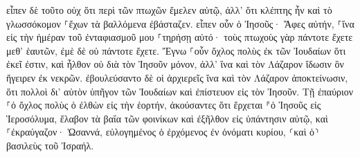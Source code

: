 \documentclass{openreader}
\begin{document}
εἶπεν δὲ τοῦτο οὐχ ὅτι περὶ τῶν πτωχῶν ἔμελεν αὐτῷ, ἀλλ’ ὅτι κλέπτης ἦν καὶ τὸ γλωσσόκομον ⸀ἔχων τὰ βαλλόμενα ἐβάσταζεν. 
εἶπεν οὖν ὁ Ἰησοῦς· Ἄφες αὐτήν, ⸀ἵνα εἰς τὴν ἡμέραν τοῦ ἐνταφιασμοῦ μου ⸀τηρήσῃ αὐτό· 
τοὺς πτωχοὺς γὰρ πάντοτε ἔχετε μεθ’ ἑαυτῶν, ἐμὲ δὲ οὐ πάντοτε ἔχετε. 
Ἔγνω ⸀οὖν ὄχλος πολὺς ἐκ τῶν Ἰουδαίων ὅτι ἐκεῖ ἐστιν, καὶ ἦλθον οὐ διὰ τὸν Ἰησοῦν μόνον, ἀλλ’ ἵνα καὶ τὸν Λάζαρον ἴδωσιν ὃν ἤγειρεν ἐκ νεκρῶν. 
ἐβουλεύσαντο δὲ οἱ ἀρχιερεῖς ἵνα καὶ τὸν Λάζαρον ἀποκτείνωσιν, 
ὅτι πολλοὶ δι’ αὐτὸν ὑπῆγον τῶν Ἰουδαίων καὶ ἐπίστευον εἰς τὸν Ἰησοῦν. 
Τῇ ἐπαύριον ⸀ὁ ὄχλος πολὺς ὁ ἐλθὼν εἰς τὴν ἑορτήν, ἀκούσαντες ὅτι ἔρχεται ⸁ὁ Ἰησοῦς εἰς Ἱεροσόλυμα, 
ἔλαβον τὰ βαΐα τῶν φοινίκων καὶ ἐξῆλθον εἰς ὑπάντησιν αὐτῷ, καὶ ⸀ἐκραύγαζον· Ὡσαννά, εὐλογημένος ὁ ἐρχόμενος ἐν ὀνόματι κυρίου, ⸂καὶ ὁ⸃ βασιλεὺς τοῦ Ἰσραήλ. 
\end{document}
